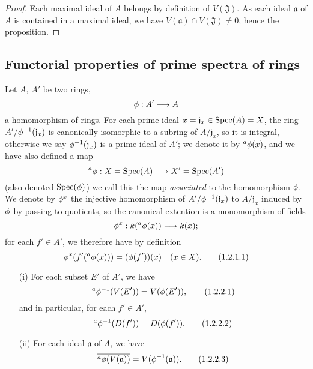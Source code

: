 \begin{proof}
\label{proof-prop-1.1.1.15}
Each maximal ideal of $A$ belongs by definition of $V(\mathfrak{J})$.
As each ideal $\mathfrak{a}$ of $A$ is contained in a maximal ideal, we have
$V(\mathfrak{a})\cap V(\mathfrak{J})\neq 0$, hence the proposition.
\end{proof}

\subsection{Functorial properties of prime spectra of rings}
\label{subsection-func-prop}

\begin{env}[1.2.1]
\label{env-1.1.2.1}
Let $A$, $A'$ be two rings,
\[
  \phi:A'\longrightarrow A
\]
a homomorphism of rings. For each prime ideal $x=\mathfrak{j}_x\in{\mathop{\mathrm{Spec}}\nolimits}(A)=X$, the
ring $A'/\phi^{-1}(\mathfrak{j}_x)$ is canonically isomorphic to a subring of
$A/\mathfrak{j}_x$, so it is integral, otherwise we say
$\phi^{-1}(\mathfrak{j}_x)$ is a prime ideal of $A'$; we denote it by
${}^a\phi(x)$, and we have also defined a map
\[
  {}^a\phi:X={\mathop{\mathrm{Spec}}\nolimits}(A)\longrightarrow X'={\mathop{\mathrm{Spec}}\nolimits}(A')
\]
(also denoted ${\mathop{\mathrm{Spec}}\nolimits}(\phi)$) we call this the map {\it associated} to the
homomorphism $\phi$. We denote by $\phi^x$ the injective homomorphism of
$A'/\phi^{-1}(\mathfrak{j}_x)$ to $A/\mathfrak{j}_x$ induced by $\phi$ by
passing to quotients, so the canonical extention is a monomorphism of fields
\[
  \phi^x:k({}^a\phi(x))\longrightarrow k(x);
\]
for each $f'\in A'$, we therefore have by definition
\[
  \phi^x(f'({}^a\phi(x)))=(\phi(f'))(x)\quad(x\in X).
  \tag{1.2.1.1}
\]
\end{env}

\begin{prop}[1.2.2]
\label{prop-1.1.2.2}
\medskip\noindent
\begin{itemize}
  \item[{\rm(i)}] For each subset $E'$ of $A'$, we have
        \[
          {}^a\phi^{-1}(V(E'))=V(\phi(E')),
          \tag{1.2.2.1}
        \]
        and in particular, for each $f'\in A'$,
        \[
          {}^a\phi^{-1}(D(f'))=D(\phi(f')).
          \tag{1.2.2.2}
        \]
  \item[{\rm(ii)}] For each ideal $\mathfrak{a}$ of $A$, we have
        \[
          \overline{{}^a\phi(V(\mathfrak{a}))}=V(\phi^{-1}(\mathfrak{a})).
          \tag{1.2.2.3}
        \]
\end{itemize}
\end{prop}

